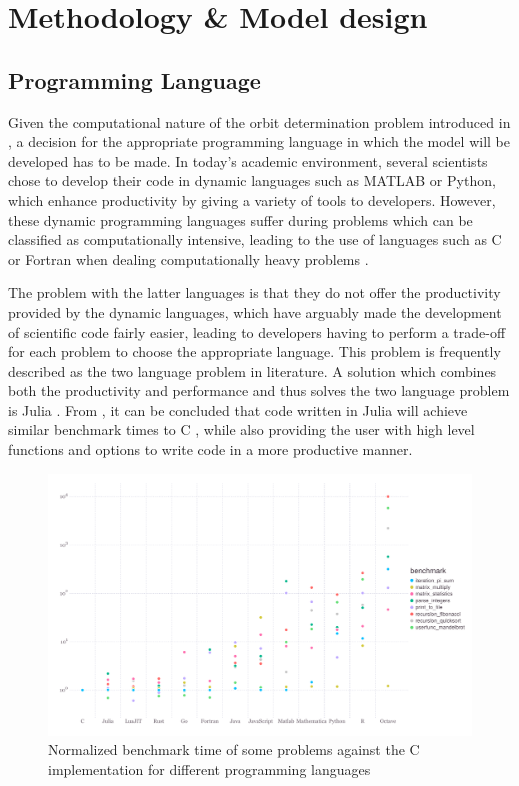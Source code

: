 \chapter{Methodology \& Model design}
\label{chap:methodology}

\section{Programming Language}
\label{sec:language}

Given the computational nature of the orbit determination problem introduced in , a decision for the appropriate programming language in which the model will be developed has to be made. In today's academic environment, several scientists chose to develop their code in dynamic languages such as MATLAB or Python, which enhance productivity by giving a variety of tools to developers. However, these dynamic programming languages suffer during problems which can be classified as computationally intensive, leading to the use of languages such as C or Fortran when dealing computationally heavy problems \cite{Julia-2017}. 

The problem with the latter languages is that they do not offer the productivity provided by the dynamic languages, which have arguably made the development of scientific code fairly easier, leading to developers having to perform a trade-off for each problem to choose the appropriate language.  This problem is frequently described as the two language problem in literature. A solution which combines both the productivity and performance and thus solves the two language problem is Julia \cite{Julia-2017}. From , it can be concluded that code written in Julia will achieve similar benchmark times to C \cite{julia-benchmark}, while also providing the user with high level functions and options to write code in a more productive manner.

\begin{figure}[h]
	\centering
	\includegraphics[width=\textwidth]{Figures/Chapter2/julia_benchmarks.pdf}
	\caption{Normalized benchmark time of some problems against the C implementation for different programming languages \cite{julia-benchmark}}
	\label{fig:julia_bench}
\end{figure}

